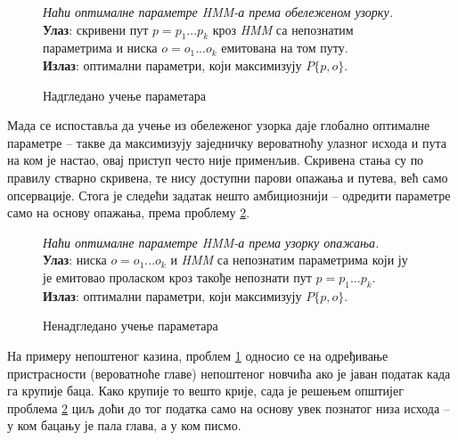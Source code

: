 \documentclass[12pt,oneside]{memoir}
\newenvironment{problem}[1][!ht]
{\renewcommand{\algorithmcfname}{Проблем}
\begin{figure}[!ht]
\centering
  \begin{minipage}{.94\linewidth}
	\begin{algorithm}[#1]%
  }{\end{algorithm}
  \end{minipage}
\end{figure}}
\begin{document}
\begin{CJK}{UTF8}{ipxm}
\begin{problem}[H]
  \SetAlgoLined
  \textit{Наћи оптималне параметре \textit{HMM}-а према обележеном узорку.}\\
  \textbf{Улаз}: скривени пут $p = p_1...p_k$ кроз \textit{HMM} са непознатим параметрима и ниска $o = o_1...o_k$ емитована на том путу.\\
  \textbf{Излаз}: оптимални параметри, који максимизују $P\{p, o\}$.
  \caption[]{Надгледано учење параметара\footnotemark}
  \label{prob:params}
\end{problem}


Мада се испоставља да учење из обележеног узорка даје глобално оптималне параметре -- такве да максимизују заједничку вероватноћу улазног исхода и пута на ком је настао, овај приступ често није применљив. Скривена стања су по правилу стварно скривена, те нису доступни парови опажања и путева, већ само опсервације. Стога је следећи задатак нешто амбициознији -- одредити параметре само на основу опажања, према проблему \ref{prob:vituch}.

\begin{problem}[H]
  \SetAlgoLined
  \textit{Наћи оптималне параметре \textit{HMM}-а према узорку опажања.}\\
  \textbf{Улаз}: ниска $o = o_1...o_k$ и \textit{HMM} са непознатим параметрима који ју је емитовао проласком кроз такође непознати пут $p = p_1...p_k$.\\
  \textbf{Излаз}: оптимални параметри, који максимизују $P\{p, o\}$.
  \caption[]{Ненадгледано учење параметара\footnotemark\footnotemark}
  \label{prob:vituch}
\end{problem}



На примеру непоштеног казина, проблем \ref{prob:params} односио се на одређивање пристрасности (вероватноће главе) непоштеног новчића ако је јаван податак када га крупије баца. Како крупије то вешто крије, сада је решењем општијег проблема \ref{prob:vituch} циљ доћи до тог податка само на основу увек познатог низа исхода -- у ком бацању је пала глава, а у ком писмо.


\end{CJK}
\end{document}
